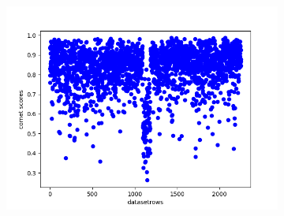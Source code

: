 \begin{figure}[ht]
\begin{subfigure}{0.6\textwidth}
        \includegraphics[width=\linewidth]{Latex/sections/images/references.png}
    \end{subfigure}
    \label{fig:reference scatterplot}
\end{figure}




